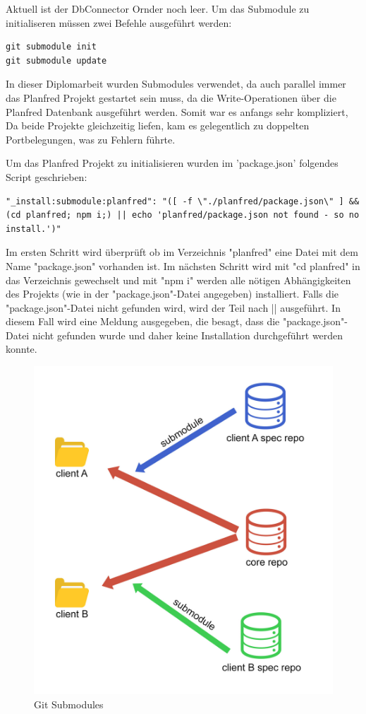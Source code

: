 Aktuell ist der DbConnector Ornder noch leer. Um das Submodule zu initialiseren müssen zwei Befehle ausgeführt werden:

\begin{lstlisting}
git submodule init
git submodule update
\end{lstlisting}

In dieser Diplomarbeit wurden Submodules verwendet, da auch parallel immer das Planfred Projekt gestartet sein muss, da die Write-Operationen über die Planfred Datenbank ausgeführt werden. Somit war es anfangs sehr kompliziert, Da beide Projekte gleichzeitig liefen, kam es gelegentlich zu doppelten Portbelegungen, was zu Fehlern führte.

Um das Planfred Projekt zu initialisieren wurden im 'package.json' folgendes Script geschrieben:

\begin{lstlisting}
"_install:submodule:planfred": "([ -f \"./planfred/package.json\" ] && (cd planfred; npm i;) || echo 'planfred/package.json not found - so no install.')"
\end{lstlisting}

Im ersten Schritt wird überprüft ob im Verzeichnis "planfred" eine Datei mit dem Name "package.json" vorhanden ist. Im nächsten Schritt wird mit "cd planfred" in das Verzeichnis gewechselt und mit "npm i" werden alle nötigen Abhängigkeiten des Projekts (wie in der "package.json"-Datei angegeben) installiert. Falls die "package.json"-Datei nicht gefunden wird, wird der Teil nach || ausgeführt. In diesem Fall wird eine Meldung ausgegeben, die besagt, dass die "package.json"-Datei nicht gefunden wurde und daher keine Installation durchgeführt werden konnte. 
\cite{git_sub_modules}

\begin{figure}[h!]
    \centering
    \includegraphics[width=0.6\linewidth]{pics/git-submodules.jpg}
    \caption{Git Submodules}
    \label{fig:enter-label}
\end{figure}



